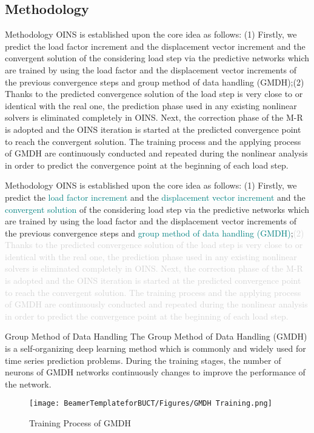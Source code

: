 \documentclass[
10pt,
aspectratio=169,
]{beamer}
\begin{document}
\subsection{Methodology}
\begin{frame}{Methodology}
    OINS is established upon the core idea as follows: (1) Firstly, we predict the load factor increment and the displacement vector increment and the convergent solution of the considering load step via the predictive networks which are trained by using the load factor and the displacement vector increments of the previous convergence steps and group method of data handling (GMDH);(2) Thanks to the predicted convergence solution of the load step is very close to or identical with the real one, the prediction phase used in any existing nonlinear solvers is eliminated completely in OINS. Next, the correction phase of the M-R is adopted and the OINS iteration is started at the predicted convergence point to reach the convergent solution. The training process and the applying process of GMDH are continuously conducted and repeated during the nonlinear analysis in order to predict the convergence point at the beginning of each load step.
\end{frame}
\begin{frame}{Methodology}
    OINS is established upon the core idea as follows: (1) Firstly, we predict the \textcolor{teal}{load factor increment} and the \textcolor{teal}{displacement vector increment} and the \textcolor{teal}{convergent solution} of the considering load step via the predictive networks which are trained by using the load factor and the displacement vector increments of the previous convergence steps and \textcolor{teal}{group method of data handling (GMDH)};\textcolor{lightgray}{(2) Thanks to the predicted convergence solution of the load step is very close to or identical with the real one, the prediction phase used in any existing nonlinear solvers is eliminated completely in OINS. Next, the correction phase of the M-R is adopted and the OINS iteration is started at the predicted convergence point to reach the convergent solution. The training process and the applying process of GMDH are continuously conducted and repeated during the nonlinear analysis in order to predict the convergence point at the beginning of each load step.}
\end{frame}
\begin{frame}{Group Method of Data Handling}
    The Group Method of Data Handling (GMDH) is a self-organizing deep learning method which is commonly and widely used for time series prediction problems. During the training stages, the number of neurons of GMDH networks continuously changes to improve the performance of the network.

    \begin{figure}
        \centering
        \texttt{[image: BeamerTemplateforBUCT/Figures/GMDH Training.png]}
        \caption{Training Process of GMDH}
        \label{fig:enter-label}
    \end{figure}
\end{frame}
\end{document}
